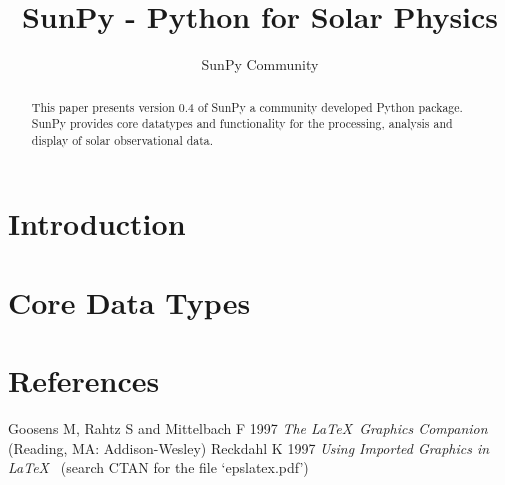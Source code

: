 \documentclass[12pt]{iopart}
\begin{document}
\title{SunPy - Python for Solar Physics}

\author{SunPy Community}

\begin{abstract}
This paper presents version 0.4 of SunPy a community developed Python package.
SunPy provides core datatypes and functionality for the processing, analysis and display of solar observational data.

\end{abstract}

\maketitle

\section{Introduction}

\section{Core Data Types}

\section*{References}
\begin{thebibliography}{10}
 Goosens M, Rahtz S and Mittelbach F 1997 {\it The \LaTeX\ Graphics Companion\/} 
(Reading, MA: Addison-Wesley)
 Reckdahl K 1997 {\it Using Imported Graphics in \LaTeX\ } (search CTAN for the file `epslatex.pdf')
\end{thebibliography}
\end{document}
